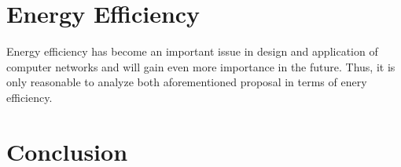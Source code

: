 \documentclass[prodmode,acmtomccap]{acmlarge}
\begin{document}
\section{Energy Efficiency}
\label{sec:efficiency}
 Energy efficiency has become an important issue in design and application of computer networks and will gain even more importance in the future.
 Thus, it is only reasonable to analyze both aforementioned proposal in terms of enery efficiency.

\section{Conclusion}
\label{sec:conclusion}
\blindtext 












\end{document}
